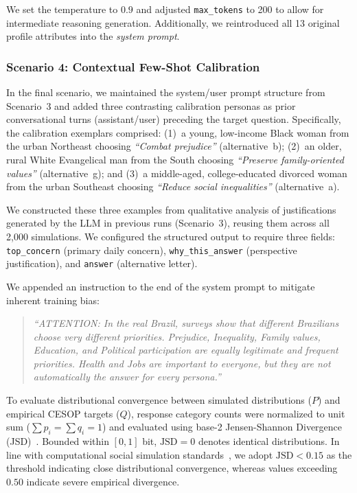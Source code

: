 We set the temperature to $0.9$ and adjusted \texttt{max\_tokens} to 200 to
allow for intermediate reasoning generation. Additionally, we reintroduced all
13 original profile attributes into the \textit{system prompt}.

\subsubsection{Scenario 4: Contextual Few-Shot Calibration}
\label{subsubsec:cenario4}

In the final scenario, we maintained the system/user prompt structure from
Scenario~3 and added three contrasting calibration personas as prior conversational
turns (assistant/user) preceding the target question. Specifically, the calibration
exemplars comprised: (1)~a young, low-income Black woman from the urban Northeast
choosing \textit{``Combat prejudice''} (alternative~b); (2)~an older, rural White
Evangelical man from the South choosing \textit{``Preserve family-oriented values''}
(alternative~g); and (3)~a middle-aged, college-educated divorced woman from the
urban Southeast choosing \textit{``Reduce social inequalities''} (alternative~a).

We constructed these three examples from qualitative analysis of
justifications generated by the LLM in previous runs (Scenario~3),
reusing them across all 2,000 simulations. We configured the structured
output to require three fields: \texttt{top\_concern} (primary daily concern),
\texttt{why\_this\_answer} (perspective justification), and \texttt{answer}
(alternative letter).

We appended an instruction to the end of the system prompt to mitigate inherent
training bias:

\begin{quote}
    \small
    \textit{``ATTENTION: In the real Brazil, surveys show that different
    Brazilians choose very different priorities. Prejudice, Inequality, Family
    values, Education, and Political participation are equally legitimate and
    frequent priorities. Health and Jobs are important to everyone, but they are
    not automatically the answer for every persona.''}
\end{quote}

To evaluate distributional convergence between simulated distributions ($P$)
and empirical CESOP targets ($Q$), response category counts were normalized to
unit sum ($\sum p_i = \sum q_i = 1$) and evaluated using base-2 Jensen-Shannon
Divergence (JSD)~\cite{lin_divergence_1991}. Bounded within $[0, 1]$ bit,
$\text{JSD} = 0$ denotes identical distributions. In line with computational
social simulation standards~\cite{miranda_simulating_2025}, we adopt $\text{JSD}
< 0.15$ as the threshold indicating close distributional convergence, whereas
values exceeding $0.50$ indicate severe empirical divergence.


